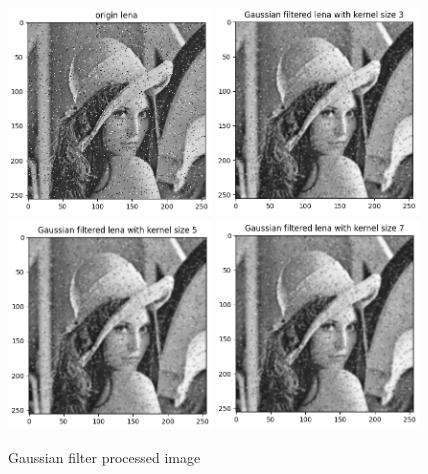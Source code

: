 \begin{figure}[htbp]
    \centering
	\includegraphics[width=0.48\textwidth]{../images/p3/p3_noisy.png}
	\includegraphics[width=0.48\textwidth]{../images/p3/p3b_3x3.png}
	\includegraphics[width=0.48\textwidth]{../images/p3/p3b_5x5.png}
	\includegraphics[width=0.48\textwidth]{../images/p3/p3b_7x7.png}
    \caption{Gaussian filter processed image}
\label{fig:p3b}
\end{figure}



